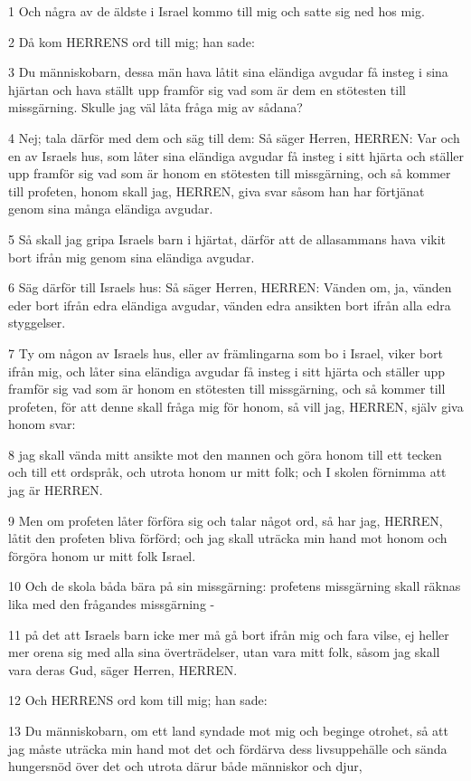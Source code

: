 \par 1 Och några av de äldste i Israel kommo till mig och satte sig ned hos mig.
\par 2 Då kom HERRENS ord till mig; han sade:
\par 3 Du människobarn, dessa män hava låtit sina eländiga avgudar få insteg i sina hjärtan och hava ställt upp framför sig vad som är dem en stötesten till missgärning. Skulle jag väl låta fråga mig av sådana?
\par 4 Nej; tala därför med dem och säg till dem: Så säger Herren, HERREN: Var och en av Israels hus, som låter sina eländiga avgudar få insteg i sitt hjärta och ställer upp framför sig vad som är honom en stötesten till missgärning, och så kommer till profeten, honom skall jag, HERREN, giva svar såsom han har förtjänat genom sina många eländiga avgudar.
\par 5 Så skall jag gripa Israels barn i hjärtat, därför att de allasammans hava vikit bort ifrån mig genom sina eländiga avgudar.
\par 6 Säg därför till Israels hus: Så säger Herren, HERREN: Vänden om, ja, vänden eder bort ifrån edra eländiga avgudar, vänden edra ansikten bort ifrån alla edra styggelser.
\par 7 Ty om någon av Israels hus, eller av främlingarna som bo i Israel, viker bort ifrån mig, och låter sina eländiga avgudar få insteg i sitt hjärta och ställer upp framför sig vad som är honom en stötesten till missgärning, och så kommer till profeten, för att denne skall fråga mig för honom, så vill jag, HERREN, själv giva honom svar:
\par 8 jag skall vända mitt ansikte mot den mannen och göra honom till ett tecken och till ett ordspråk, och utrota honom ur mitt folk; och I skolen förnimma att jag är HERREN.
\par 9 Men om profeten låter förföra sig och talar något ord, så har jag, HERREN, låtit den profeten bliva förförd; och jag skall uträcka min hand mot honom och förgöra honom ur mitt folk Israel.
\par 10 Och de skola båda bära på sin missgärning: profetens missgärning skall räknas lika med den frågandes missgärning -
\par 11 på det att Israels barn icke mer må gå bort ifrån mig och fara vilse, ej heller mer orena sig med alla sina överträdelser, utan vara mitt folk, såsom jag skall vara deras Gud, säger Herren, HERREN.
\par 12 Och HERRENS ord kom till mig; han sade:
\par 13 Du människobarn, om ett land syndade mot mig och beginge otrohet, så att jag måste uträcka min hand mot det och fördärva dess livsuppehälle och sända hungersnöd över det och utrota därur både människor och djur,
